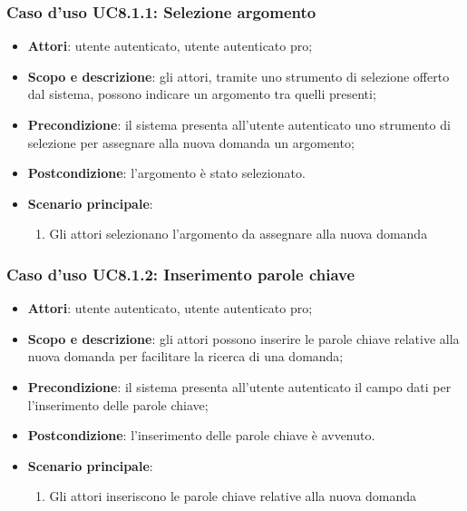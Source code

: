 	\subsubsection{Caso d'uso UC8.1.1: Selezione argomento}
	\begin{itemize}
		\item
			\textbf{Attori}: utente autenticato, utente autenticato pro;
		\item
			\textbf{Scopo e descrizione}: gli attori, tramite uno strumento di selezione offerto dal sistema, possono indicare un argomento tra quelli presenti;
		\item		
			\textbf{Precondizione}: il sistema presenta all'utente autenticato uno strumento di selezione per assegnare alla nuova domanda un argomento;
		\item
			\textbf{Postcondizione}: l'argomento è stato selezionato.
		\item
			\textbf{Scenario principale}:
				\begin{enumerate}
					\item 	
						Gli attori selezionano l'argomento da assegnare alla nuova domanda	
				\end{enumerate}
	\end{itemize}	
	\subsubsection{Caso d'uso UC8.1.2: Inserimento parole chiave}
	\begin{itemize}
		\item
			\textbf{Attori}: utente autenticato, utente autenticato pro;
		\item
			\textbf{Scopo e descrizione}: gli attori possono inserire le parole chiave relative alla nuova domanda per facilitare la ricerca di una domanda;
		\item		
			\textbf{Precondizione}: il sistema presenta all'utente autenticato il campo dati per l'inserimento delle parole chiave;
		\item
			\textbf{Postcondizione}: l'inserimento delle parole chiave è avvenuto.
		\item
			\textbf{Scenario principale}:
				\begin{enumerate}
					\item 	
						Gli attori inseriscono le parole chiave relative alla nuova domanda	
				\end{enumerate}
	\end{itemize}
